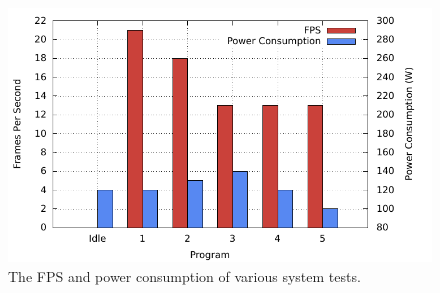 \begin{figure}[h!]
\centering
\includegraphics[width=\textwidth]{fig/res/lena-benchmark-plot.pdf}
\caption[LENA Benchmarks]{The FPS and power consumption of various system tests.}
\label{fig:lena-benchmark-plot}
\end{figure}
